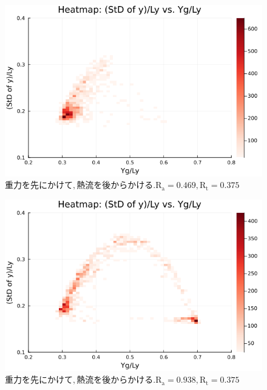 \begin{figure}[H]
  \centering
  \includegraphics[scale=0.6]{image/RaRtmap_drop_heat/2023-12-21T10:44:58.322_RaRtmap_chi1.265_Ay50_rho0.4_T0.43_dT0.04_Rd0.0_Rt0.375_Ra0.4693845_g0.0003999718779659611_run4.0e7.png}
  \caption{$重力を先にかけて, 熱流を後からかける. \text{R}_\text{a}=0.469,\text{R}_\text{t}=0.375$}
  \label{}
\end{figure}

\begin{figure}[H]
  \centering
  \includegraphics[scale=0.6]{image/RaRtmap_drop_heat/2023-12-21T10:44:58.387_RaRtmap_chi1.265_Ay50_rho0.4_T0.43_dT0.04_Rd0.0_Rt0.375_Ra0.938769_g0.0003999718779659611_run4.0e7.png}
  \caption{$重力を先にかけて, 熱流を後からかける. \text{R}_\text{a}=0.938,\text{R}_\text{t}=0.375$}
  \label{}
\end{figure}


